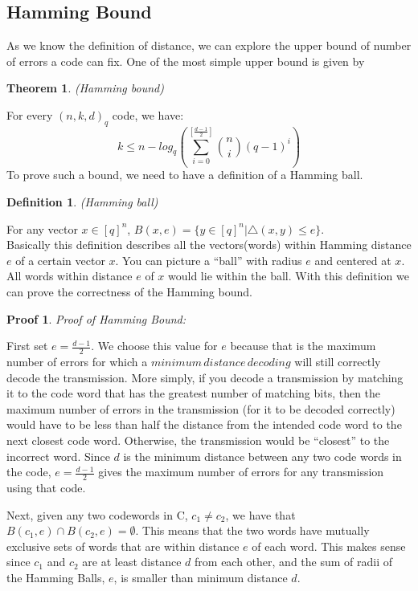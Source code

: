 \documentclass{article}
\newtheorem{Definition}{Definition}
\newtheorem{Theorem}{Theorem}
\newtheorem{Proof}{Proof}
\begin{document}
\subsection{Hamming Bound}
As we know the definition of distance, we can explore the upper bound of number of errors a code can fix. One of the most simple upper bound is given by
\begin{Theorem}(Hamming bound)\end{Theorem}
\noindent For every $(n,k,d)_{q}$ code, we have:
\begin{equation}
k \le n - log_q(\sum_{i=0}^{[\frac{d-1}{2}]}{n \choose i} (q-1)^i)
\end{equation}
To prove such a bound, we need to have a definition of a Hamming ball.
\begin{Definition}(Hamming ball)\end{Definition}
\noindent For any vector $x \in [q]^n$,
$B(x,e) = \{y \in [q]^n | \bigtriangleup (x,y) \le e\}$.\\
Basically this definition describes all the vectors(words) within Hamming distance $e$ of a certain vector $x$. You can picture a ``ball'' with radius $e$ and centered at $x$. All words within distance $e$ of $x$ would lie within the ball. With this definition we can prove the correctness of the Hamming bound.
\begin{Proof}Proof of Hamming Bound: \end{Proof} 
\noindent First set $e = \frac{d-1}{2}$. We choose this value for $e$ because that is the maximum number of errors for which a $minimum\, distance\, decoding$ will still correctly decode the transmission. More simply, if you decode a transmission by matching it to the code word that has the greatest number of matching bits, then the maximum number of errors in the transmission (for it to be decoded correctly) would have to be less than half the distance from the intended code word to the next closest code word. Otherwise, the transmission would be ``closest'' to the incorrect word. Since $d$ is the minimum distance between any two code words in the code,  $e = \frac{d-1}{2}$ gives the maximum number of errors for any transmission using that code. 

 Next, given any two codewords in C, $c_1 \neq c_2$, we have that $B(c_1,e) \cap B(c_2,e) = \emptyset$. This means that the two words have mutually exclusive sets of words that are within distance $e$ of each word. This makes sense since $c_1$ and $c_2$ are at least distance $d$ from each other, and the sum of radii of the Hamming Balls, $e$, is smaller than minimum distance $d$. 
\end{document}
